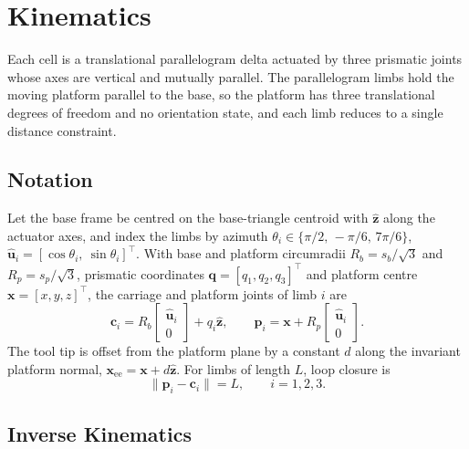 \section{Kinematics}
\label{sec:kinematics}

Each cell is a translational parallelogram delta actuated by three prismatic
joints whose axes are vertical and mutually parallel. The parallelogram limbs
hold the moving platform parallel to the base, so the platform has three
translational degrees of freedom and no orientation state, and each limb reduces
to a single distance constraint.

\subsection{Notation}

Let the base frame be centred on the base-triangle centroid with
$\hat{\mathbf{z}}$ along the actuator axes, and index the limbs by azimuth
$\theta_i \in \{\pi/2,\, -\pi/6,\, 7\pi/6\}$, $\hat{\mathbf{u}}_i =
[\cos\theta_i,\ \sin\theta_i]^{\!\top}$. With base and platform circumradii
$R_b=s_b/\sqrt3$ and $R_p=s_p/\sqrt3$, prismatic coordinates
$\mathbf{q}=[q_1,q_2,q_3]^{\!\top}$ and platform centre
$\mathbf{x}=[x,y,z]^{\!\top}$, the carriage and platform joints of limb $i$ are
\begin{equation}
\mathbf{c}_i = R_b \begin{bmatrix}\hat{\mathbf{u}}_i\\0\end{bmatrix} + q_i\hat{\mathbf{z}},
\qquad
\mathbf{p}_i = \mathbf{x} + R_p \begin{bmatrix}\hat{\mathbf{u}}_i\\0\end{bmatrix}.
\end{equation}
The tool tip is offset from the platform plane by a constant $d$ along the
invariant platform normal, $\mathbf{x}_{\text{ee}}=\mathbf{x}+d\hat{\mathbf{z}}$.
For limbs of length $L$, loop closure is
\begin{equation}
\label{eq:closure}
\|\mathbf{p}_i-\mathbf{c}_i\| = L, \qquad i=1,2,3.
\end{equation}

\subsection{Inverse Kinematics}

